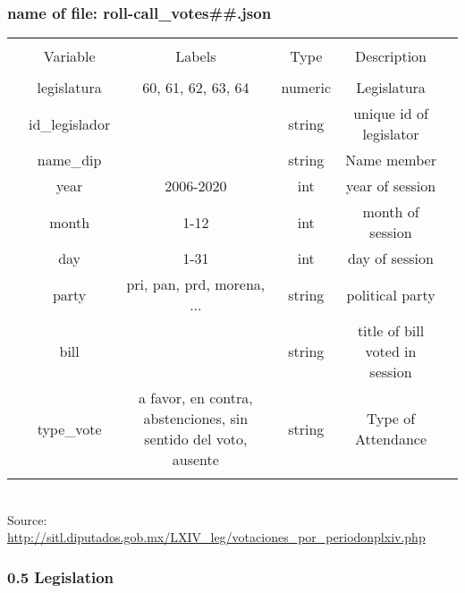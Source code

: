\documentclass{article}
\begin{document}
\subsubsection*{name of file: roll-call\_votes\#\#.json}
\begin{table}[!htbp] \centering 
	\begin{tabular}{@{\extracolsep{5pt}} cccccc} 
		\\[-1.8ex]\hline 
		\hline \\[-1.8ex] 
		& Variable & Labels  & Type & Description \\ 
		\hline \\[-1.8ex] 
		& legislatura  &60, 61, 62, 63, 64 & numeric  & Legislatura   \\ 
		& id\_legislador  &   & string  & unique id of legislator   \\ 
		& name\_dip &   &string & Name member\\
		& year & 2006-2020  &  int & year of session  \\ 
		& month  & 1-12  & int  & month of session  \\ 
		& day & 1-31  & int & day of session\\
		& party & pri, pan, prd, morena, ...   & string& political party\\
		& bill &  & string& title of bill voted in session\\
		& type\_vote & a favor, en contra, abstenciones, sin sentido del voto, ausente & string& Type of Attendance \\
		\hline
		\\[-1.8ex] 
	\end{tabular} 
	\\
	Source:  \url{http://sitl.diputados.gob.mx/LXIV_leg/votaciones_por_periodonplxiv.php}\\
\end{table} 


\newpage
\subsubsection*{0.5 Legislation}
\end{document}
